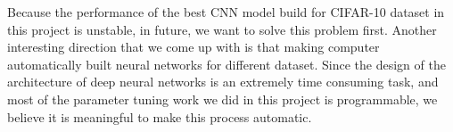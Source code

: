 \documentclass[]{UCD_CS_FYP_Report}
\begin{document}
Because the performance of the best CNN model build for CIFAR-10 dataset in this project is unstable, in future, we want to solve this problem first. Another interesting direction that we come up with is that making computer automatically built neural networks for different dataset. Since the design of the architecture of deep neural networks is an extremely time consuming task, and most of the parameter tuning work we did in this project is programmable, we believe it is meaningful to make this process automatic.




\newpage
 



\label{endpage}
\end{document}

